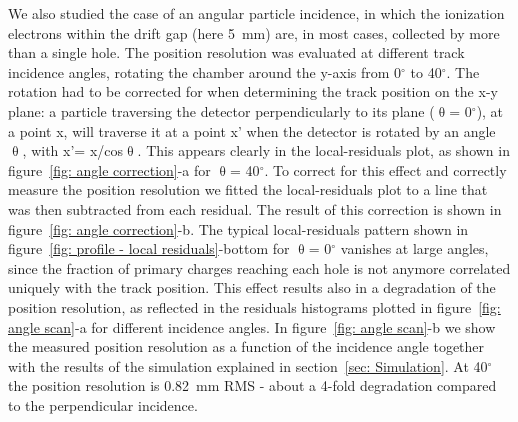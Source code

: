 We also studied the case of an angular particle incidence, in which the ionization electrons within the drift gap (here 5~mm) are, in most cases, collected by more than a single hole. The position resolution was evaluated at different track incidence angles, rotating the chamber around the y-axis from 0$^\circ$ to 40$^\circ$. The rotation had to be corrected for when determining the track position on the x-y plane: a particle traversing the detector perpendicularly to its plane ($\uptheta$= 0$^\circ$), at a point x, will traverse it at a point x' when the detector is rotated by an angle $\uptheta$, with x'= x/cos$\uptheta$. This appears clearly in the local-residuals plot, as shown in figure~\ref{fig: angle correction}-a for $\uptheta$= 40$^\circ$. To correct for this effect and correctly measure the position resolution we fitted the local-residuals plot to a line that was then subtracted from each residual. The result of this correction is shown in figure~\ref{fig: angle correction}-b. The typical local-residuals pattern shown in figure~\ref{fig: profile - local residuals}-bottom for $\uptheta$= 0$^\circ$ vanishes at large angles, since the fraction of primary charges reaching each hole is not anymore correlated uniquely with the track position. This effect results also in a degradation of the position resolution, as reflected in the residuals histograms plotted in figure~\ref{fig: angle scan}-a for different incidence angles. In figure~\ref{fig: angle scan}-b we show the measured position resolution as a function of the incidence angle together with the results of the simulation explained in section~\ref{sec: Simulation}. At 40$^\circ$ the position resolution is 0.82~mm RMS - about a 4-fold degradation compared to the perpendicular incidence.


